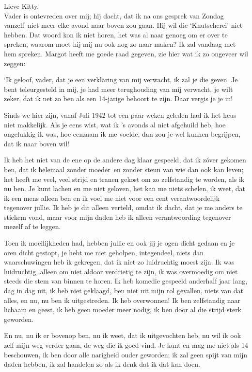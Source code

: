 \documentclass{book}
\begin{document}
Lieve Kitty,\\
Vader is ontevreden over mij; hij dacht, dat ik na ons gesprek
van Zondag vanzelf~niet meer elke avond naar boven zou gaan. Hij wil die
`Knutscherei' niet hebben. Dat woord kon ik niet horen, het was al naar genoeg
om er over te spreken, waarom moet hij mij nu ook nog zo naar maken? Ik zal
vandaag met hem spreken. Margot heeft me goede raad gegeven, zie hier wat ik zo
ongeveer wil zeggen:

`Ik geloof, vader, dat je een verklaring van mij verwacht, ik zal je die geven.
Je bent teleurgesteld in mij, je had meer terughouding van mij verwacht, je wilt
zeker, dat ik net zo ben als een 14-jarige behoort te zijn. Daar vergis je je
in!

Sinds we hier zijn, vanaf Juli 1942 tot een paar weken geleden had ik het heus
niet makkelijk. Als je eens wist, wat ik 's avonds al niet afgehuild heb, hoe
ongelukkig ik was, hoe eenzaam ik me voelde, dan zou je wel kunnen begrijpen,
dat ik naar boven wil!

Ik heb het niet van de ene op de andere dag klaar gespeeld, dat ik zóver gekomen
ben, dat ik helemaal zonder moeder~en zonder steun van wie dan ook kan leven;
het heeft me veel, veel strijd en tranen gekost om zo zelfstandig te worden, als
ik nu ben. Je kunt lachen en me niet geloven, het kan me niets schelen, ik weet,
dat ik een mens alleen ben en ik voel me niet voor een cent verantwoordelijk
tegenover jullie. Ik heb je dit alleen verteld, omdat ik dacht, dat je me anders
te stiekem vond, maar voor mijn daden heb ik alleen verantwoording tegenover
mezelf af te leggen.

Toen ik moeilijkheden had, hebben jullie en ook jij je ogen dicht gedaan en je
oren dicht gestopt, je hebt me niet geholpen, integendeel, niets dan
waarschuwingen heb ik gekregen, dat ik niet zo luidruchtig moest zijn. Ik was
luidruchtig, alleen om niet aldoor verdrietig te zijn, ik was overmoedig om niet
steeds die stem van binnen te horen. Ik heb komedie gespeeld anderhalf jaar
lang, dag in dag uit, ik heb niet geklaagd, ben niet uit mijn rol gevallen,
niets van dat alles, en nu, nu ben ik uitgestreden. Ik heb overwonnen! Ik ben
zelfstandig naar lichaam en geest, ik heb geen moeder meer nodig, ik ben door al
die strijd sterk geworden.

En nu, nu ik er bovenop ben, nu ik weet, dat ik uitgevochten heb, nu wil ik ook
zelf mijn weg verder gaan, de weg die ik goed vind. Je kunt en mag me niet als
14 beschouwen, ik ben door alle narigheid ouder geworden; ik zal geen spijt van
mijn daden hebben, ik zal handelen zo als ik denk dat ik dat kan doen.
\end{document}
